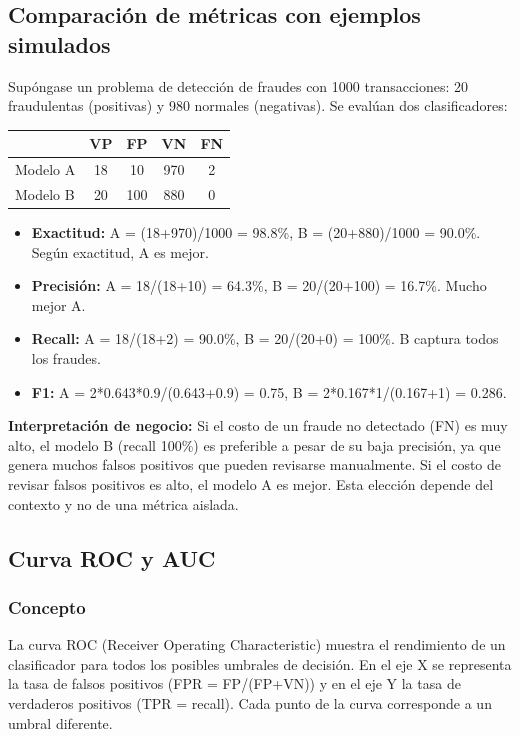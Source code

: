 \documentclass[12pt,a4paper,openany,oneside]{book}
\begin{document}
\subsection{Comparación de métricas con ejemplos simulados}
Supóngase un problema de detección de fraudes con 1000 transacciones: 20 fraudulentas (positivas) y 980 normales (negativas). Se evalúan dos clasificadores:

\begin{table}[h]
\centering
\begin{tabular}{l|c|c|c|c}
 & \textbf{VP} & \textbf{FP} & \textbf{VN} & \textbf{FN} \\
\hline
Modelo A & 18 & 10 & 970 & 2 \\
Modelo B & 20 & 100 & 880 & 0 \\
\end{tabular}
\end{table}

\begin{itemize}
    \item \textbf{Exactitud:} A = (18+970)/1000 = 98.8\%, B = (20+880)/1000 = 90.0\%. Según exactitud, A es mejor.
    \item \textbf{Precisión:} A = 18/(18+10) = 64.3\%, B = 20/(20+100) = 16.7\%. Mucho mejor A.
    \item \textbf{Recall:} A = 18/(18+2) = 90.0\%, B = 20/(20+0) = 100\%. B captura todos los fraudes.
    \item \textbf{F1:} A = 2*0.643*0.9/(0.643+0.9) = 0.75, B = 2*0.167*1/(0.167+1) = 0.286.
\end{itemize}

\textbf{Interpretación de negocio:} Si el costo de un fraude no detectado (FN) es muy alto, el modelo B (recall 100\%) es preferible a pesar de su baja precisión, ya que genera muchos falsos positivos que pueden revisarse manualmente. Si el costo de revisar falsos positivos es alto, el modelo A es mejor. Esta elección depende del contexto y no de una métrica aislada.

\subsection{Curva ROC y AUC}

\subsubsection{Concepto}
La curva ROC (Receiver Operating Characteristic) muestra el rendimiento de un clasificador para todos los posibles umbrales de decisión. En el eje X se representa la tasa de falsos positivos (FPR = FP/(FP+VN)) y en el eje Y la tasa de verdaderos positivos (TPR = recall). Cada punto de la curva corresponde a un umbral diferente.
\end{document}
